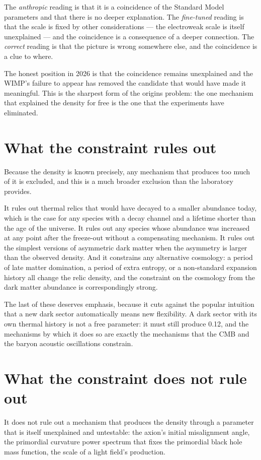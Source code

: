 The \emph{anthropic} reading is that it is a coincidence of the Standard
Model parameters and that there is no deeper explanation. The
\emph{fine-tuned} reading is that the scale is fixed by other considerations
--- the electroweak scale is itself unexplained --- and the coincidence is a
consequence of a deeper connection. The \emph{correct} reading is that the
picture is wrong somewhere else, and the coincidence is a clue to where.

The honest position in 2026 is that the coincidence remains unexplained and
the WIMP's failure to appear has removed the candidate that would have made
it meaningful. This is the sharpest form of the origins problem: the one
mechanism that explained the density for free is the one that the
experiments have eliminated.

\section{What the constraint rules out}Because the density is known precisely, any
mechanism that produces too much of it is excluded, and this is a much
broader exclusion than the laboratory provides.

It rules out thermal relics that would have decayed to a smaller abundance
today, which is the case for any species with a decay channel and a
lifetime shorter than the age of the universe. It rules out any
species whose abundance was increased at any point after the freeze-out
without a compensating mechanism. It rules out the simplest versions of
asymmetric dark matter when the asymmetry is larger than the observed
density. And it constrains any alternative cosmology: a period of late
matter domination, a period of extra entropy, or a non-standard expansion
history all change the relic density, and the constraint on the cosmology
from the dark matter abundance is correspondingly strong.

The last of these deserves emphasis, because it cuts against the popular
intuition that a new dark sector automatically means new flexibility. A
dark sector with its own thermal history is not a free parameter: it must
still produce 0.12, and the mechanisms by which it does so are exactly the
mechanisms that the CMB and the baryon acoustic oscillations constrain.

\section{What the constraint does not rule out}It does not rule out a mechanism
that produces the density through a parameter that is itself unexplained
and untestable: the axion's initial misalignment angle, the primordial
curvature power spectrum that fixes the primordial black hole mass
function, the scale of a light field's production.

